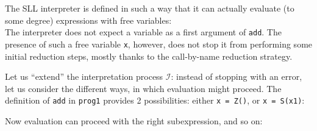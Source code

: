 
The SLL interpreter is defined in such a way that it can actually evaluate (to some degree)
expressions with free variables:\\


The interpreter does not expect a variable as a first argument of \texttt{add}. 
The presence of such a free variable \texttt{x}, however, does not stop it from
performing some initial reduction steps, mostly thanks to the call-by-name
reduction strategy.

Let us ``extend'' the interpretation process $\mathcal{I}$:
instead of stopping with an error, let us consider the different ways, in which
evaluation might proceed.
The definition of \texttt{add} in \texttt{prog1} provides 2 possibilities:
either \texttt{x = Z()}, or \texttt{x = S(x1)}:



Now evaluation can proceed with the right subexpression, and so on:




